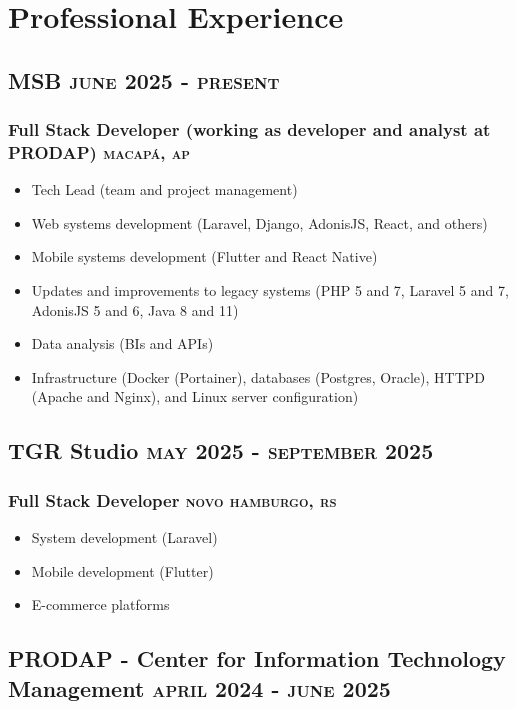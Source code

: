 \documentclass{article}
\newcommand{\rside}[1]{\hfill \normalfont\scshape\MakeLowercase{#1}}
\begin{document}
\section{\faChartPie\enspace Professional Experience}

\subsection{MSB \rside{June 2025 - Present}}
\subsubsection{Full Stack Developer (working as developer and analyst at PRODAP) \rside{Macapá, AP}}
\begin{itemize}
  \item Tech Lead (team and project management)
  \item Web systems development (Laravel, Django, AdonisJS, React, and others)
  \item Mobile systems development (Flutter and React Native)
  \item Updates and improvements to legacy systems (PHP 5 and 7, Laravel 5 and 7, AdonisJS 5 and 6, Java 8 and 11)
  \item Data analysis (BIs and APIs)
  \item Infrastructure (Docker (Portainer), databases (Postgres, Oracle), HTTPD (Apache and Nginx), and Linux server configuration)
\end{itemize}

\subsection{TGR Studio \rside{May 2025 - September 2025}}
\subsubsection{Full Stack Developer \rside{Novo Hamburgo, RS}}
\begin{itemize}
  \item System development (Laravel)
  \item Mobile development (Flutter)
  \item E-commerce platforms
\end{itemize}

\subsection{PRODAP - Center for Information Technology Management \rside{April 2024 - June 2025}}
\end{document}

